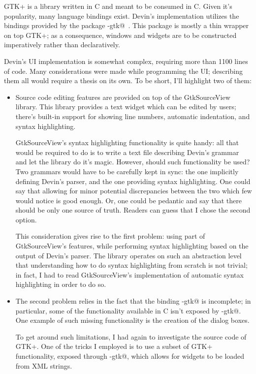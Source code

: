 \documentclass[UdineBachThesis,american,11pt]{PhdThesis}
\begin{document}
  GTK+ is a library written in C and meant to be consumed in C. Given it's
  popularity, many language bindings exist. Devin's implementation utilizes the
  bindings provided by the package \lstinline@gi-gtk@~\cite{gi-gtk}. This
  package is mostly a thin wrapper on top GTK+; as a consequence, windows and
  widgets are to be constructed imperatively rather than declaratively.

  Devin's UI implementation is somewhat complex, requiring more than 1100 lines
  of code. Many considerations were made while programming the UI; describing
  them all would require a thesis on its own. To be short, I'll highlight two
  of them:

  \begin{itemize}
    \item Source code editing features are provided on top of the GtkSourceView
    library. This library provides a text widget which can be edited by users;
    there's built-in support for showing line numbers, automatic indentation,
    and syntax highlighting.

    GtkSourceView's syntax highlighting functionality is quite handy: all that
    would be required to do is to write a text file describing Devin's grammar
    and let the library do it's magic. However, should such functionality be
    used? Two grammars would have to be carefully kept in sync: the one
    implicitly defining Devin's parser, and the one providing syntax
    highlighting. One could say that allowing for minor potential discrepancies
    between the two which few would notice is good enough. Or, one could be
    pedantic and say that there should be only one source of truth. Readers can
    guess that I chose the second option.

    This consideration gives rise to the first problem: using part of
    GtkSourceView's features, while performing syntax highlighting based on the
    output of Devin's parser. The library operates on such an abstraction level
    that understanding how to do syntax highlighting from scratch is not
    trivial; in fact, I had to read GtkSourceView's implementation of automatic
    syntax highlighting in order to do so.

    \item The second problem relies in the fact that the binding
    \lstinline@gi-gtk@ is incomplete; in particular, some of the functionality
    available in C isn't exposed by \lstinline@gi-gtk@. One example of such
    missing functionality is the creation of the dialog boxes.

    To get around such limitations, I had again to investigate the source code
    of GTK+. One of the tricks I employed is to use a subset of GTK+
    functionality, exposed through \lstinline@gi-gtk@, which allows for widgets
    to be loaded from XML strings.
  \end{itemize}
\end{document}
